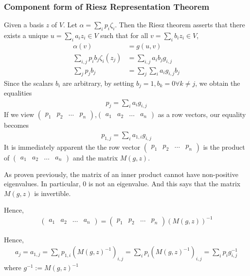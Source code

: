 \documentclass{article}
\begin{document}
\subsubsection{Component form of Riesz Representation Theorem}
Given a basis $z$ of $V$. Let $\alpha=\sum_i p_i\zeta_i$.
Then the Riesz theorem asserts that there exists a unique $u=\sum_i a_iz_i\in V$ such that for all $v=\sum_i b_iz_i \in V$,
\begin{align*}
	\alpha(v) &= g(u,v)\\
	\sum_{i,j}p_ib_j\zeta_i(z_j) &= \sum_{i,j}a_ib_jg_{i,j}\\
	\sum_j p_jb_j &= \sum_j \sum_i a_ig_{i,j}b_j
\end{align*}
Since the scalars $b_i$ are arbitrary, by setting $b_j=1, b_k=0\forall k\neq j$, we obtain the equalities
\begin{align*}
	p_j = \sum_ia_ig_{i,j}
\end{align*}
If we view $\begin{pmatrix}
p_1 & p_2 & \dots & p_n
\end{pmatrix}$,$\begin{pmatrix}
a_1 & a_2 & \dots & a_n
\end{pmatrix}$  as a row vectors,
our equality becomes 
\begin{align*}
	p_{1,j} = \sum_ia_{1,i}g_{i,j}
\end{align*}
It is immediately apparent the the row vector $\begin{pmatrix}
p_1 & p_2 & \dots & p_n
\end{pmatrix}$ is the product of $\begin{pmatrix}
a_1 & a_2 & \dots & a_n
\end{pmatrix}$ and the matrix $M(g,z)$.

As proven previously, the matrix of an inner product cannot have non-positive eigenvalues. In particular, 0 is not an eigenvalue. And this says that the matrix $M(g,z)$ is invertible.

Hence, 
\begin{align*}
\begin{pmatrix}
a_1 & a_2 & \dots & a_n
\end{pmatrix} = \begin{pmatrix}
p_1 & p_2 & \dots & p_n
\end{pmatrix}(M(g,z))^{-1}
\end{align*}

Hence,
\begin{align*}
	a_j=a_{1,j} = \sum_ip_{1,i}(M(g,z)^{-1})_{i,j} = \sum_ip_i(M(g,z)^{-1})_{i,j} = \sum_i p_i g^{-1}_{i,j}
\end{align*}
where $g^{-1}:=M(g,z)^{-1}$
\end{document}
